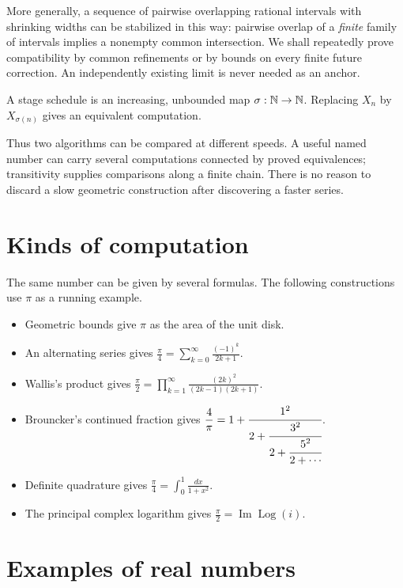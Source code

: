 More generally, a sequence of pairwise overlapping rational intervals with
shrinking widths can be stabilized in this way: pairwise overlap of a
\emph{finite} family of intervals implies a nonempty common intersection.
We shall repeatedly prove compatibility by common refinements or by bounds
on every finite future correction.  An independently existing limit is
never needed as an anchor.

\begin{definition}\label{def:stage-schedule}
A stage schedule is an increasing, unbounded map $\sigma:\mathbb{N}\to\mathbb{N}$.
Replacing $X_n$ by $X_{\sigma(n)}$ gives an equivalent computation.
\end{definition}

Thus two algorithms can be compared at different speeds.  A useful named
number can carry several computations connected by proved equivalences;
transitivity supplies comparisons along a finite chain.  There is no reason
to discard a slow geometric construction after discovering a faster series.

\section{Kinds of computation}\label{sec:computations-of-pi}

The same number can be given by several formulas. The following
constructions use \(\pi\) as a running example.

\begin{itemize}
\item Geometric bounds give \(\pi\) as the area of the unit disk.
\item An alternating series gives
\(\displaystyle \frac{\pi}{4}=\sum_{k=0}^{\infty}\frac{(-1)^k}{2k+1}\).
\item Wallis's product gives
\(\displaystyle \frac{\pi}{2}=\prod_{k=1}^{\infty}\frac{(2k)^2}{(2k-1)(2k+1)}\).
\item Brouncker's continued fraction gives
\(\displaystyle \frac4\pi=1+\cfrac{1^2}{2+\cfrac{3^2}{2+\cfrac{5^2}{2+\cdots}}}\).
\item Definite quadrature gives
\(\displaystyle \frac{\pi}{4}=\int_0^1\frac{dx}{1+x^2}\).
\item The principal complex logarithm gives
\(\displaystyle \frac{\pi}{2}=\operatorname{Im}\operatorname{Log}(i)\).
\end{itemize}

\section{Examples of real numbers}

